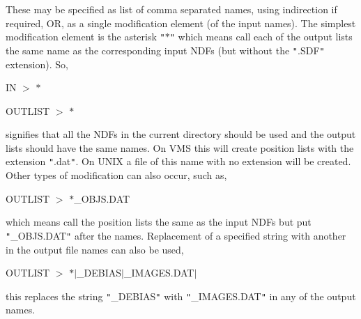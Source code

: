 {{{         These may be specified as list of comma separated names,
         using indirection if required, OR, as a single modification
         element (of the input names). The simplest modification
         element is the asterisk {\tt "}$*${\tt "} which means call each of the
         output lists the same name as the corresponding input NDFs (but
         without the {\tt "}.SDF{\tt "} extension).
         So,
         \begin{description}
            \item IN $>$ $*$
            \item OUTLIST $>$ $*$
         \end{description}
         signifies that all the NDFs in the current directory should be
         used and the output lists should have the same names. On VMS
         this will create position lists with the extension {\tt "}.dat{\tt "}. On
         UNIX a file of this name with no extension will be created.
         Other types of modification can also occur, such as,
         \begin{description}
            \item OUTLIST $>$ $*$\_OBJS.DAT
         \end{description}
         which means call the position lists the same as the input NDFs
         but put {\tt "}\_OBJS.DAT{\tt "} after the names. Replacement of a specified
         string with another in the output file names can also be used,
         \begin{description}
            \item OUTLIST $>$ $*$$|$\_DEBIAS$|$\_IMAGES.DAT$|$
         \end{description}
         this replaces the string {\tt "}\_DEBIAS{\tt "} with {\tt "}\_IMAGES.DAT{\tt "} in any
         of the output names.

}}}
